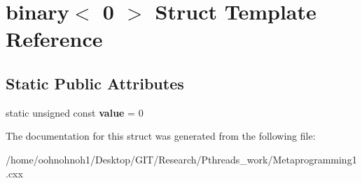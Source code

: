 \hypertarget{structbinary_3_010_01_4}{}\section{binary$<$ 0 $>$ Struct Template Reference}
\label{structbinary_3_010_01_4}
\subsection*{Static Public Attributes}
\begin{DoxyCompactItemize}
\item 
\mbox{\label{structbinary_3_010_01_4_aff4cd37ff042fbf643ce6816df9f6f16}} 
static unsigned const {\bfseries value} = 0
\end{DoxyCompactItemize}


The documentation for this struct was generated from the following file\+:\begin{DoxyCompactItemize}
\item 
/home/oohnohnoh1/\+Desktop/\+G\+I\+T/\+Research/\+Pthreads\+\_\+work/Metaprogramming1.\+cxx\end{DoxyCompactItemize}

